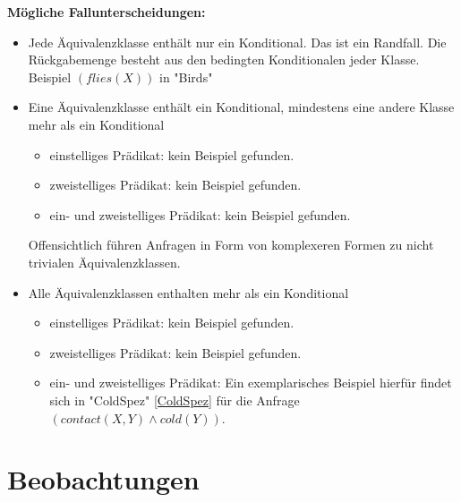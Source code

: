 \documentclass[a4paper, 11pt]{book}
\begin{document}
\textbf{Mögliche Fallunterscheidungen:}\label{Fallunterscheidung Formel MehrAequi}
	\begin{itemize}
		\item Jede Äquivalenzklasse enthält nur ein Konditional. Das ist ein Randfall. Die Rückgabemenge besteht aus den bedingten Konditionalen jeder Klasse. Beispiel $ (flies(X)) $ in "{}Birds"{}  
		\item Eine Äquivalenzklasse enthält ein Konditional, mindestens eine andere Klasse mehr als ein Konditional
		\begin{itemize}
			\item einstelliges Prädikat: kein Beispiel gefunden.
			\item zweistelliges Prädikat: kein Beispiel gefunden.
			\item ein- und zweistelliges Prädikat: kein Beispiel gefunden.
		\end{itemize}
		Offensichtlich führen Anfragen in Form von komplexeren Formen zu nicht trivialen Äquivalenzklassen. 
		\item Alle Äquivalenzklassen enthalten mehr als ein Konditional
			\begin{itemize}
			\item einstelliges Prädikat: kein Beispiel gefunden.
				\item zweistelliges Prädikat: kein Beispiel gefunden.
			\item ein- und zweistelliges Prädikat: Ein exemplarisches Beispiel hierfür findet sich in "{}ColdSpez"{} \ref{ColdSpez} für die Anfrage  $ (contact(X,Y) \land cold(Y)) $.
		\end{itemize}
	\end{itemize}

\section{Beobachtungen}
\end{document}

